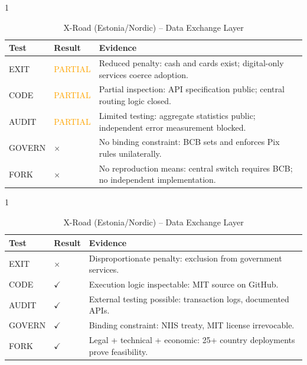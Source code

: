 \documentclass{article}
\begin{document}
\begin{table}[htbp]
    \begin{subtable}{1\textwidth}
        \centering
        \caption{Pix (Brazil) -- Central Bank Payment}
        \small
        \begin{tabular}{@{}llp{8.5cm}@{}}
            \toprule
            \textbf{Test} & \textbf{Result} & \textbf{Evidence} \\
            \midrule
            EXIT & \textcolor{orange}{PARTIAL} & Reduced penalty: cash and cards exist; digital-only services coerce adoption. \\
            CODE & \textcolor{orange}{PARTIAL} & Partial inspection: API specification public; central routing logic closed. \\
            AUDIT & \textcolor{orange}{PARTIAL} & Limited testing: aggregate statistics public; independent error measurement blocked. \\
            GOVERN & $\times$ & No binding constraint: BCB sets and enforces Pix rules unilaterally. \\
            FORK & $\times$ & No reproduction means: central switch requires BCB; no independent implementation. \\
            \bottomrule
        \end{tabular}
        \vspace{0.3cm}
    \end{subtable}

    \begin{subtable}{1\textwidth}
        \centering
        \caption{X-Road (Estonia/Nordic) -- Data Exchange Layer}
        \small
        \begin{tabular}{@{}llp{8.5cm}@{}}
            \toprule
            \textbf{Test} & \textbf{Result} & \textbf{Evidence} \\
            \midrule
            EXIT & $\times$ & Disproportionate penalty: exclusion from government services. \\
            CODE & $\checkmark$ & Execution logic inspectable: MIT source on GitHub. \\
            AUDIT & $\checkmark$ & External testing possible: transaction logs, documented APIs. \\
            GOVERN & $\checkmark$ & Binding constraint: NIIS treaty, MIT license irrevocable. \\
            FORK & $\checkmark$ & Legal + technical + economic: 25+ country deployments prove feasibility. \\
            \bottomrule
        \end{tabular}
        \vspace{0.3cm}
    \end{subtable}


\end{table}
\end{document}
